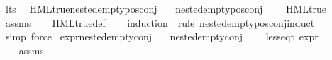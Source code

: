 \begin{isabellebody}
\isamarkupfalse%
%
\endisatagproof
{\isafoldproof}%
%
\isadelimproof
\isanewline
%
\endisadelimproof
\isanewline
{}\isamarkupfalse%
\ lts\ \isanewline
{}\isamarkupfalse%
\ HML{\isacharunderscore}{\kern0pt}true{\isacharunderscore}{\kern0pt}nested{\isacharunderscore}{\kern0pt}empty{\isacharunderscore}{\kern0pt}pos{\isacharunderscore}{\kern0pt}conj{\isacharcolon}{\kern0pt}\isanewline
\ \ \ {\isachardoublequoteopen}nested{\isacharunderscore}{\kern0pt}empty{\isacharunderscore}{\kern0pt}pos{\isacharunderscore}{\kern0pt}conj\ {\isasymphi}{\isachardoublequoteclose}\isanewline
\ \ \ {\isachardoublequoteopen}HML{\isacharunderscore}{\kern0pt}true\ {\isasymphi}{\isachardoublequoteclose}\isanewline
%
\isadelimproof
\ \ %
\endisadelimproof
%
\isatagproof
{}\isamarkupfalse%
\ assms\isanewline
\ \ \isamarkupfalse%
\ HML{\isacharunderscore}{\kern0pt}true{\isacharunderscore}{\kern0pt}def\isanewline
\ \ \isamarkupfalse%
\ {\isacharparenleft}{\kern0pt}induction\ {\isasymphi}\ rule{\isacharcolon}{\kern0pt}\ nested{\isacharunderscore}{\kern0pt}empty{\isacharunderscore}{\kern0pt}pos{\isacharunderscore}{\kern0pt}conj{\isachardot}{\kern0pt}induct{\isacharparenright}{\kern0pt}\isanewline
\ \ \isamarkupfalse%
\ {\isacharparenleft}{\kern0pt}simp{\isacharcomma}{\kern0pt}\ force{\isacharparenright}{\kern0pt}%
\endisatagproof
{\isafoldproof}%
%
\isadelimproof
\isanewline
%
\endisadelimproof
{}\isamarkupfalse%
\isanewline
\isanewline
{}\isamarkupfalse%
\ expr{\isacharunderscore}{\kern0pt}nested{\isacharunderscore}{\kern0pt}empty{\isacharunderscore}{\kern0pt}conj{\isacharcolon}{\kern0pt}\isanewline
\ \ \ {\isachardoublequoteopen}nested{\isacharunderscore}{\kern0pt}empty{\isacharunderscore}{\kern0pt}conj\ {\isasymphi}{\isachardoublequoteclose}\isanewline
\ \ \ {\isachardoublequoteopen}less{\isacharunderscore}{\kern0pt}eq{\isacharunderscore}{\kern0pt}t\ {\isacharparenleft}{\kern0pt}expr\ {\isasymphi}{\isacharparenright}{\kern0pt}\ {\isacharparenleft}{\kern0pt}{}{\isacharcomma}{\kern0pt}\ {\isasyminfinity}{\isacharcomma}{\kern0pt}\ {}{\isacharcomma}{\kern0pt}\ {}{\isacharcomma}{\kern0pt}\ {}{\isacharcomma}{\kern0pt}\ {}{\isacharparenright}{\kern0pt}{\isachardoublequoteclose}\isanewline
%
\isadelimproof
\ \ %
\endisadelimproof
%
\isatagproof
{}\isamarkupfalse%
\ assms\isanewline

\end{isabellebody}

